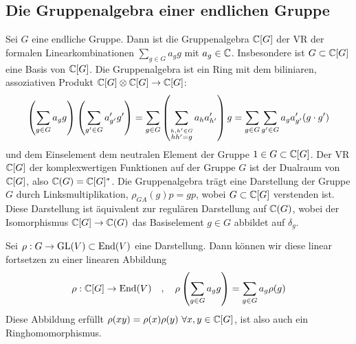 \subsection{Die Gruppenalgebra einer endlichen Gruppe}

\begin{definition}[Gruppenalgebra]
    Sei $G$ eine endliche Gruppe. Dann ist die Gruppenalgebra $\mathbb{C}[G]$ der
    VR der formalen Linearkombinationen $\sum_{g \in G} a_g g$ mit
    $a_g \in \mathbb{C}$. Insbesondere ist $G \subset \mathbb{C}[G]$ eine Basis von
    $\mathbb{C}[G]$. Die Gruppenalgebra ist ein Ring mit dem biliniaren, assoziativen
    Produkt $\mathbb{C}[G] \otimes \mathbb{C}[G] \rightarrow \mathbb{C}[G]$:
    \begin{align*}
        \left( \sum_{g \in G} a_g g \right) \left( \sum_{g' \in G} a_{g'}' g' \right)
        = \sum_{g \in G} \left( \sum_{\stackrel{h,h' \in G}{hh' = g}} a_h a_{h'}' \right) g
        = \sum_{g \in G} \sum_{g' \in G} a_g a_{g'}' (g \cdot g')
    \end{align*}
    und dem Einselement dem neutralen Element der Gruppe $1 \in G \subset
    \mathbb{C}[G]$. Der VR $\mathbb{C}[G]$ der komplexwertigen Funktionen auf der Gruppe $G$
    ist der Dualraum von $\mathbb{C}[G]$, also $\mathbb{C}(G) = \mathbb{C}[G]^\ast$. Die Gruppenalgebra
    trägt eine Darstellung der Gruppe $G$ durch Linksmultiplikation,
    $\rho_{GA}(g) p = g p$, wobei $G \subset \mathbb{C}[G]$ verstenden ist. Diese
    Darstellung ist äquivalent zur regulären Darstellung auf $\mathbb{C}(G)$, wobei
    der Isomorphismus $\mathbb{C}[G] \rightarrow \mathbb{C}(G)$ das Basiselement $g \in G$
    abbildet auf $\delta_g$.
\end{definition}

\begin{theorem}
    Sei $\rho: G \rightarrow \text{GL}(V) \subset \text{End}(V)$ eine Darstellung. Dann
    können wir diese linear fortsetzen zu einer linearen Abbildung
    \begin{align*}
        \rho: \mathbb{C}[G] \rightarrow \text{End}(V)
        \hspace{10pt} , \hspace{10pt}
        \rho \left( \sum_{g \in G} a_g g \right) = \sum_{g \in G} a_g \rho(g)
    \end{align*}
    Diese Abbildung erfüllt $\rho(xy) = \rho(x) \rho(y) \ \forall x,y \in \mathbb{C}[G]$,
    ist also auch ein Ringhomomorphismus.
\end{theorem}

